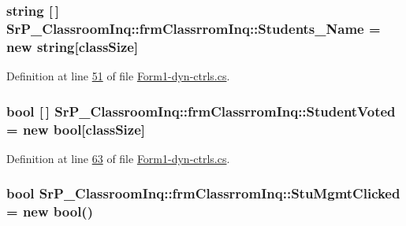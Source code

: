 \hypertarget{class_sr_p___classroom_inq_1_1frm_classrrom_inq_ad595ee0cb55235eda789723fe8967521}{
\subsubsection[{\-Students\-\_\-\-Name}]{\setlength{\rightskip}{0pt plus 5cm}string \mbox{[}$\,$\mbox{]} {\bf \-Sr\-P\-\_\-\-Classroom\-Inq\-::frm\-Classrrom\-Inq\-::\-Students\-\_\-\-Name} = new string\mbox{[}{\bf class\-Size}\mbox{]}}}
\label{class_sr_p___classroom_inq_1_1frm_classrrom_inq_ad595ee0cb55235eda789723fe8967521}


\-Definition at line \hyperlink{_form1-dyn-ctrls_8cs_source_l00051}{51} of file \hyperlink{_form1-dyn-ctrls_8cs_source}{\-Form1-\/dyn-\/ctrls.\-cs}.

\hypertarget{class_sr_p___classroom_inq_1_1frm_classrrom_inq_a1a7e4f2ef2b99a4a641431918fedf7f5}{
\subsubsection[{\-Student\-Voted}]{\setlength{\rightskip}{0pt plus 5cm}bool \mbox{[}$\,$\mbox{]} {\bf \-Sr\-P\-\_\-\-Classroom\-Inq\-::frm\-Classrrom\-Inq\-::\-Student\-Voted} = new bool\mbox{[}{\bf class\-Size}\mbox{]}}}
\label{class_sr_p___classroom_inq_1_1frm_classrrom_inq_a1a7e4f2ef2b99a4a641431918fedf7f5}


\-Definition at line \hyperlink{_form1-dyn-ctrls_8cs_source_l00063}{63} of file \hyperlink{_form1-dyn-ctrls_8cs_source}{\-Form1-\/dyn-\/ctrls.\-cs}.

\hypertarget{class_sr_p___classroom_inq_1_1frm_classrrom_inq_ad0a57ebb96913cfbb9622d8c4c7b52cb}{
\subsubsection[{\-Stu\-Mgmt\-Clicked}]{\setlength{\rightskip}{0pt plus 5cm}bool {\bf \-Sr\-P\-\_\-\-Classroom\-Inq\-::frm\-Classrrom\-Inq\-::\-Stu\-Mgmt\-Clicked} = new bool()}}
\label{class_sr_p___classroom_inq_1_1frm_classrrom_inq_ad0a57ebb96913cfbb9622d8c4c7b52cb}


